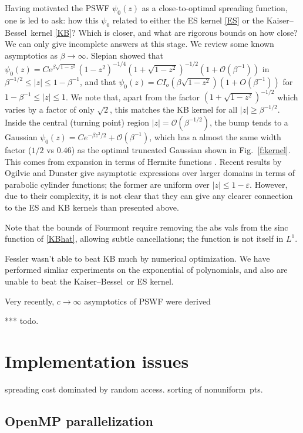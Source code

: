\documentclass[10pt]{article}
\newcommand{\eps}{\varepsilon}
\newcommand{\bigO}{{\mathcal O}}
\newcommand{\freq}{\beta}          %
\newcommand{\NU}{{nonuniform}}       %
\newcommand{\KB}{Kaiser--Bessel}
\begin{document}
Having motivated the PSWF $\psi_0(z)$ as a close-to-optimal
spreading function, one is led to ask:
how this $\psi_0$ related to either the
ES kernel \eqref{ES} or the \KB\ kernel \eqref{KB}?
Which is closer, and what are rigorous bounds on how close?
We can only give incomplete answers at this stage.
We review some known asymptotics as $\freq\to\infty$.
Slepian \cite[(1.4)]{slepian65}
showed that $\psi_0(z) = C e^{\freq\sqrt{1-z^2}} (1-z^2)^{-1/4}
(1+\sqrt{1-z^2})^{-1/2}(1 + \bigO(\freq^{-1}))$
in $\freq^{-1/2} \le |z| \le 1-\freq^{-1}$,
and
that $\psi_0(z) = C I_o(\freq \sqrt{1-z^2}) (1 + O(\freq^{-1}))$
for $1-\freq^{-1} \le |z| \le 1$.
We note that, apart from the factor $(1+\sqrt{1-z^2})^{-1/2}$
which varies by a factor of only $\sqrt{2}$,
this matches the KB kernel for all $|z|\ge \freq^{-1/2}$.
Inside the central (turning point) region
$|z| = \bigO(\freq^{-1/2})$,
the bump tends to a Gaussian
$\psi_0(z) = C e^{-\beta z^2 /2} + \bigO(\freq^{-1})$,
which has a almost the same width factor ($1/2$ vs $0.46$) as the
optimal truncated Gaussian shown in Fig.~\ref{f:kernel}.
This comes from expansion in terms of Hermite functions
\cite{fuchs} \cite[Sec.~8.6]{osipov}.
Recent results by Ogilvie \cite[Sec.~4.4]{ogilvie}
and Dunster \cite{dunster}
give asymptotic expressions over larger domains
in terms of parabolic cylinder functions;
the former are uniform over $|z|\le 1-\eps$.
However, due to their complexity,
it is not clear that they can give
any clearer connection to the ES and KB kernels than presented above.


Note that the bounds of Fourmont require removing the abs vals
from the sinc function of \eqref{KBhat}, allowing subtle cancellations;
the function is not itself in $L^1$.

Fessler wasn't able to beat KB much by numerical optimization.
We have performed simliar experiments on the
exponential of polynomials, and also are unable to beat the \KB\ or
ES kernel.

Very recently, $c\to\infty$ asymptotics of PSWF were derived

*** todo.


\section{Implementation issues}

spreading cost dominated by random access.
sorting of \NU\ pts.

\subsection{OpenMP parallelization}
\end{document}
